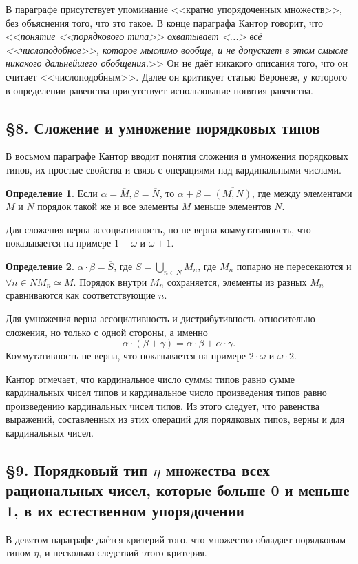 \documentclass[a4paper,12pt]{extarticle}
\theoremstyle{definition}
\newtheorem{definition}{Определение}
\newcommand{\cit}[1]{<<\textit{#1}>>}
\begin{document}
В параграфе присутствует упоминание <<кратно упорядоченных множеств>>, без объяснения того, что это такое.
В конце параграфа Кантор говорит, что \cit{понятие <<порядкового типа>> охватывает <...> всё <<числоподобное>>, которое мыслимо вообще, и не допускает в этом смысле никакого дальнейшего обобщения.}
Он не даёт никакого описания того, что он считает <<числоподобным>>.
Далее он критикует статью Веронезе, у которого в определении равенства присутствует использование понятия равенства.

\subsection{\S 8. Сложение и умножение порядковых типов}
В восьмом параграфе Кантор вводит понятия сложения и умножения порядковых типов, их простые свойства и связь с операциями над кардинальными числами.

\begin{definition}
    Если $\alpha = \overline{M}, \beta = \overline{N}$, то $\alpha + \beta = \overline{(M, N)}$, где между элементами $M$ и $N$ порядок такой же и все элементы $M$ меньше элементов $N$.
\end{definition}
Для сложения верна ассоциативность, но не верна коммутативность, что показывается на примере $1 + \omega$ и $\omega + 1$.
\begin{definition}
    $\alpha \cdot \beta = \overline{S}$, где $S = \bigcup\limits_{n \in N}M_n$, где $M_n$ попарно не пересекаются и $\forall n \in N M_n \simeq M$.
    Порядок внутри $M_n$ сохраняется, элементы из разных $M_n$ сравниваются как соответствующие $n$.
\end{definition}
Для умножения верна ассоциативность и дистрибутивность относительно сложения, но только с одной стороны, а именно $$\alpha \cdot (\beta + \gamma) = \alpha \cdot \beta + \alpha \cdot \gamma.$$
Коммутативность не верна, что показывается на примере $2 \cdot \omega$ и $\omega \cdot 2$.

Кантор отмечает, что кардинальное число суммы типов равно сумме кардинальных чисел типов и кардинальное число произведения типов равно произведению кардинальных чисел типов.
Из этого следует, что равенства выражений, составленных из этих операций для порядковых типов, верны и для кардинальных чисел.

\subsection{\S 9. Порядковый тип $\eta$ множества всех рациональных чисел, которые больше 0 и меньше 1, в их естественном упорядочении}
В девятом параграфе даётся критерий того, что множество обладает порядковым типом $\eta$, и несколько следствий этого критерия.
\end{document}

